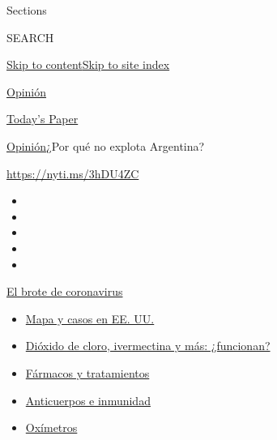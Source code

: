 Sections

SEARCH

\protect\hyperlink{site-content}{Skip to
content}\protect\hyperlink{site-index}{Skip to site index}

\href{https://www.nytimes3xbfgragh.onion/es/section/opinion}{Opinión}

\href{https://myaccount.nytimes3xbfgragh.onion/auth/login?response_type=cookie\&client_id=vi}{}

\href{https://www.nytimes3xbfgragh.onion/section/todayspaper}{Today's
Paper}

\href{/es/section/opinion}{Opinión}\textbar{}¿Por qué no explota
Argentina?

\url{https://nyti.ms/3hDU4ZC}

\begin{itemize}
\item
\item
\item
\item
\item
\end{itemize}

\href{https://www.nytimes3xbfgragh.onion/es/spotlight/coronavirus?action=click\&pgtype=Article\&state=default\&region=TOP_BANNER\&context=storylines_menu}{El
brote de coronavirus}

\begin{itemize}
\tightlist
\item
  \href{https://www.nytimes3xbfgragh.onion/es/interactive/2020/espanol/mundo/coronavirus-en-estados-unidos.html?action=click\&pgtype=Article\&state=default\&region=TOP_BANNER\&context=storylines_menu}{Mapa
  y casos en EE. UU.}
\item
  \href{https://www.nytimes3xbfgragh.onion/es/2020/07/23/espanol/america-latina/bolivia-cloro-coronavirus-ivermectina.html?action=click\&pgtype=Article\&state=default\&region=TOP_BANNER\&context=storylines_menu}{Dióxido
  de cloro, ivermectina y más: ¿funcionan?}
\item
  \href{https://www.nytimes3xbfgragh.onion/es/interactive/2020/science/coronavirus-tratamientos-curas.html?action=click\&pgtype=Article\&state=default\&region=TOP_BANNER\&context=storylines_menu}{Fármacos
  y tratamientos}
\item
  \href{https://www.nytimes3xbfgragh.onion/es/2020/07/28/espanol/ciencia-y-tecnologia/anticuerpos-coronavirus-inmunidad.html?action=click\&pgtype=Article\&state=default\&region=TOP_BANNER\&context=storylines_menu}{Anticuerpos
  e inmunidad}
\item
  \href{https://www.nytimes3xbfgragh.onion/es/2020/04/29/espanol/estilos-de-vida/oximetro-para-que-sirve.html?action=click\&pgtype=Article\&state=default\&region=TOP_BANNER\&context=storylines_menu}{Oxímetros}
\end{itemize}


